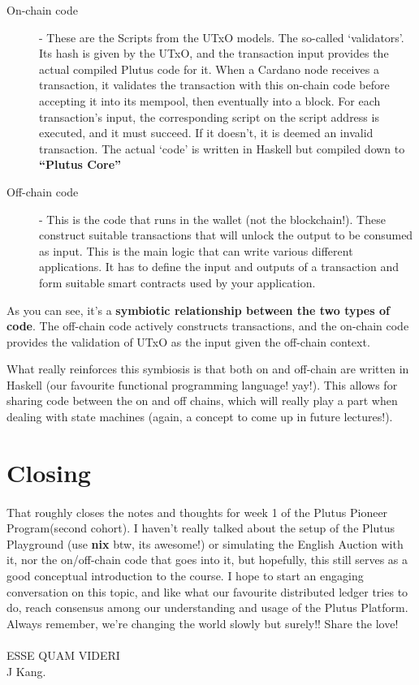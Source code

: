 \documentclass[a4paper, 11pt]{article}
\begin{document}
    \begin{description}
        \item[On-chain code] - These are the Scripts from the UTxO models. The so-called `validators'. Its hash is given by the UTxO, and the transaction input provides the actual compiled Plutus code for it. When a Cardano node receives a transaction, it validates the transaction with this on-chain code before accepting it into its mempool, then eventually into a block. For each transaction's input, the corresponding script on the script address is executed, and it must succeed. If it doesn't, it is deemed an invalid transaction. The actual `code' is written in Haskell but compiled down to \textbf{``Plutus Core''}
         
        \item[Off-chain code] - This is the code that runs in the wallet (not the blockchain!). These construct suitable transactions that will unlock the output to be consumed as input. This is the main logic that can write various different applications. It has to define the input and outputs of a transaction and form suitable smart contracts used by your application.    
    \end{description}

    As you can see, it's a \textbf{symbiotic relationship between the two types of code}. The off-chain code actively constructs transactions, and the on-chain code provides the validation of UTxO as the input given the off-chain context.

    What really reinforces this symbiosis is that both on and off-chain are written in Haskell (our favourite functional programming language! yay!). This allows for sharing code between the on and off chains, which will really play a part when dealing with state machines (again, a concept to come up in future lectures!).

    \section{Closing}
    \paragraph{} That roughly closes the notes and thoughts for week 1 of the Plutus Pioneer Program(second cohort). I haven't really talked about the setup of the Plutus Playground (use \textbf{nix} btw, its awesome!) or simulating the English Auction with it, nor the on/off-chain code that goes into it, but hopefully, this still serves as a good conceptual introduction to the course. I hope to start an engaging conversation on this topic, and like what our favourite distributed ledger tries to do, reach consensus among our understanding and usage of the Plutus Platform. Always remember, we're changing the world slowly but surely!! Share the love! \heartsuit


    \paragraph{}ESSE QUAM VIDERI\\
    J Kang.
\end{document}
